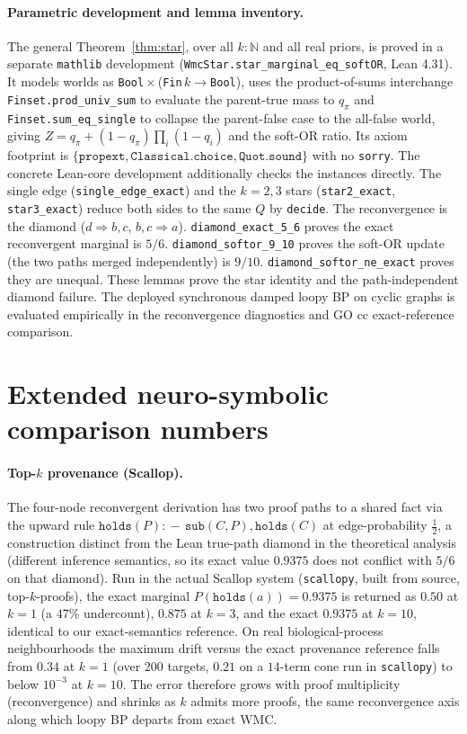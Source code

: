 \documentclass[letterpaper]{article}
\newcommand{\WMC}{\ensuremath{\mathrm{WMC}}}
\begin{document}
\paragraph{Parametric development and lemma inventory.}
The general Theorem~\ref{thm:star}, over all $k:\mathbb{N}$ and all real priors, is proved in a
separate \texttt{mathlib} development (\texttt{WmcStar.star\_marginal\_eq\_softOR}, Lean 4.31).
It models worlds as \texttt{Bool}\,$\times$\,(\texttt{Fin}\,$k\to$\texttt{Bool}), uses the
product-of-sums interchange \texttt{Finset.prod\_univ\_sum} to evaluate the parent-true mass to
$q_\pi$ and \texttt{Finset.sum\_eq\_single} to collapse the parent-false case to the all-false
world, giving $Z=q_\pi+(1-q_\pi)\prod_i(1-q_i)$ and the soft-OR ratio. Its axiom footprint is
$\{\texttt{propext},\texttt{Classical.choice},\texttt{Quot.sound}\}$ with no \texttt{sorry}. The
concrete Lean-core development additionally checks the instances directly. The single edge
(\texttt{single\_edge\_exact}) and the $k{=}2,3$ stars (\texttt{star2\_exact},
\texttt{star3\_exact}) reduce both sides to the same $Q$ by \texttt{decide}. The reconvergence is the diamond
($d\!\Rightarrow\!b,c$, $b,c\!\Rightarrow\!a$). \texttt{diamond\_exact\_5\_6} proves the exact
reconvergent marginal is $5/6$. \texttt{diamond\_softor\_9\_10} proves the soft-OR update (the
two paths merged independently) is $9/10$. \texttt{diamond\_softor\_ne\_exact} proves they
are unequal. These lemmas prove the star identity and the path-independent diamond failure.
The deployed synchronous damped loopy BP on cyclic graphs is evaluated
empirically in the reconvergence diagnostics and GO cc exact-reference
comparison.

\section{Extended neuro-symbolic comparison numbers}\label{app:nesy}

\paragraph{Top-$k$ provenance (Scallop).}
The four-node reconvergent derivation has two proof paths to a shared fact via the upward rule $\texttt{holds}(P)\!:\!-\,\texttt{sub}(C,P),\texttt{holds}(C)$ at edge-probability $\tfrac12$, a construction distinct from the Lean true-path diamond in the theoretical analysis (different inference semantics, so its exact value $0.9375$ does not conflict with $5/6$ on that diamond). Run in the actual Scallop system (\texttt{scallopy}, built from source, top-$k$-proofs), the exact marginal $P(\texttt{holds}(a))=0.9375$ is returned as $0.50$ at $k{=}1$ (a $47\%$ undercount), $0.875$ at $k{=}3$, and the exact $0.9375$ at $k{=}10$, identical to our exact-semantics reference. On real biological-process neighbourhoods the maximum drift versus the exact provenance reference falls from $0.34$ at $k{=}1$ (over 200 targets, $0.21$ on a $14$-term cone run in \texttt{scallopy}) to below $10^{-3}$ at $k{=}10$. The error therefore grows with proof multiplicity (reconvergence) and shrinks as $k$ admits more proofs, the same reconvergence axis along which loopy BP departs from exact $\WMC$.
\end{document}
